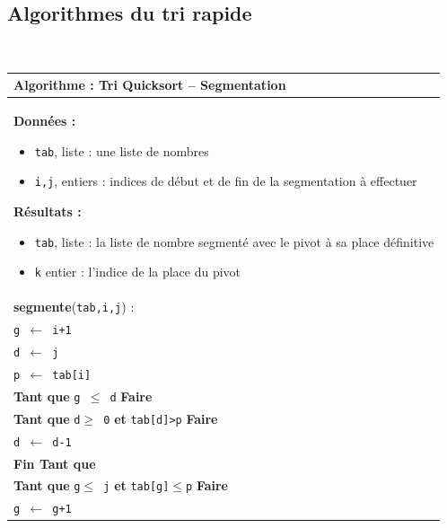 \documentclass[10pt,fleqn]{article} %
\newcommand{\tsf}[1]{\small{\texttt{#1}}}
\begin{document}
\subsection{Algorithmes du tri rapide}

\begin{minipage}[c]{.48\linewidth}
\begin{pseudo}
~\\
\begin{tabular}{p{}}
\hline
\textbf{Algorithme :} Tri Quicksort -- Segmentation\\
\hline
\textbf{Données :}
\begin{itemize}
\item \tsf{tab}, liste : une liste de nombres
\item \tsf{i,j}, entiers : indices de début et de fin de la segmentation à effectuer
\end{itemize}
\textbf{Résultats :} 
\begin{itemize}
\item \tsf{tab}, liste : la liste de nombre segmenté avec le pivot à sa place définitive
\item \tsf{k} entier : l'indice de la place du pivot
\end{itemize}
\\
\textbf{segmente}(\tsf{tab,i,j}) :\\
\hspace{.4cm} \tsf{g $\leftarrow$ i+1 }\\
\hspace{.4cm} \tsf{d $\leftarrow$ j}\\
\hspace{.4cm} \tsf{p $\leftarrow$ tab[i]}\\
\hspace{.4cm} \textbf{Tant que} \tsf{g $\leq$ d} \textbf{Faire} \\
\hspace{.8cm} \textbf{Tant que} \tsf{d$\geq$ 0} \textbf{et} \tsf{tab[d]>p} \textbf{Faire} \\
\hspace{1.2cm} \tsf{d $\leftarrow$ d-1}\\  
\hspace{.8cm} \textbf{Fin Tant que}  \\
\hspace{.8cm} \textbf{Tant que} \tsf{g$\leq$ j} \textbf{et} \tsf{tab[g]$\leq$p} \textbf{Faire} \\
\hspace{1.2cm} \tsf{g $\leftarrow$ g+1}\\  

\end{tabular}
\end{pseudo}
\end{minipage}
\end{document}
